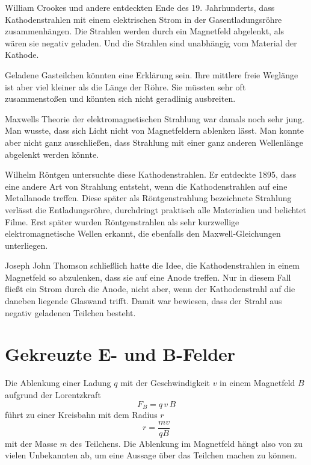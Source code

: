 William Crookes und andere entdeckten Ende des 19. Jahrhunderts, dass Kathodenstrahlen mit einem elektrischen Strom in der Gasentladungsröhre zusammenhängen. Die Strahlen werden durch ein Magnetfeld abgelenkt, als wären sie negativ geladen. Und die Strahlen sind unabhängig vom Material der Kathode.

Geladene Gasteilchen könnten eine Erklärung sein. Ihre mittlere freie Weglänge ist aber viel kleiner als die Länge der Röhre. Sie müssten sehr oft zusammenstoßen und könnten sich nicht geradlinig ausbreiten.

Maxwells Theorie der elektromagnetischen Strahlung war damals noch sehr jung. Man wusste, dass sich Licht nicht von Magnetfeldern ablenken lässt. Man konnte aber nicht ganz ausschließen, dass Strahlung mit einer ganz anderen Wellenlänge abgelenkt werden könnte.

Wilhelm Röntgen untersuchte diese Kathodenstrahlen. Er entdeckte 1895, dass eine andere Art von Strahlung entsteht, wenn die Kathodenstrahlen auf eine Metallanode treffen. Diese später als Röntgenstrahlung bezeichnete Strahlung verlässt die Entladungsröhre, durchdringt praktisch alle Materialien und belichtet Filme. Erst später wurden Röntgenstrahlen als sehr kurzwellige elektromagnetische Wellen erkannt, die ebenfalls den Maxwell-Gleichungen unterliegen.

Joseph John Thomson schließlich hatte die Idee, die Kathodenstrahlen in einem Magnetfeld so abzulenken, dass sie auf eine Anode treffen. Nur in diesem Fall fließt ein Strom durch die Anode, nicht aber, wenn der Kathodenstrahl auf die daneben liegende Glaswand trifft. Damit war bewiesen, dass der Strahl aus negativ geladenen Teilchen besteht.

\section{Gekreuzte E- und B-Felder}

Die Ablenkung einer Ladung $q$ mit der Geschwindigkeit $v$ in einem Magnetfeld $B$ aufgrund der Lorentzkraft
\begin{equation}
    F_B = q \, v \, B
\end{equation}
führt zu einer Kreisbahn mit dem Radius $r$
\begin{equation}
    r = \frac{m v}{q B}
\end{equation}
mit der Masse $m$ des Teilchens. Die Ablenkung im Magnetfeld hängt also von zu vielen Unbekannten ab, um eine Aussage über das Teilchen machen zu können.

